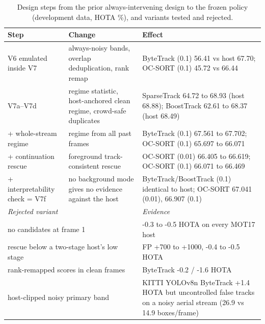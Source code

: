 \begin{table}[t]
\centering
\caption{Design steps from the prior always-intervening design to the frozen policy (development data, HOTA \%), and variants tested and rejected.}
\label{tab:ablation}
\small
\begin{tabular}{p{3.1cm}p{4.8cm}p{6.9cm}}
\hline
Step & Change & Effect \\
\hline
V6 emulated inside V7 & always-noisy bands, overlap deduplication, rank remap & ByteTrack (0.1) 56.41 vs host 67.70; OC-SORT (0.1) 45.72 vs 66.44 \\
V7a--V7d & regime statistic, host-anchored clean regime, crowd-safe duplicates & SparseTrack 64.72 to 68.93 (host 68.88); BoostTrack 62.61 to 68.37 (host 68.49) \\
+ whole-stream regime & regime from all past frames & ByteTrack (0.1) 67.561 to 67.702; OC-SORT (0.1) 65.697 to 66.071 \\
+ continuation rescue & foreground track-consistent rescue & OC-SORT (0.01) 66.405 to 66.619; OC-SORT (0.1) 66.071 to 66.469 \\
+ interpretability check = V7f & no background mode gives no evidence against the host & ByteTrack/BoostTrack (0.1) identical to host; OC-SORT 67.041 (0.01), 66.907 (0.1) \\
\hline
\multicolumn{2}{l}{\textit{Rejected variant}} & \textit{Evidence} \\
\multicolumn{2}{p{8.0cm}}{no candidates at frame 1} & -0.3 to -0.5 HOTA on every MOT17 host \\
\multicolumn{2}{p{8.0cm}}{rescue below a two-stage host's low stage} & FP +700 to +1000, -0.4 to -0.5 HOTA \\
\multicolumn{2}{p{8.0cm}}{rank-remapped scores in clean frames} & ByteTrack -0.2 / -1.6 HOTA \\
\multicolumn{2}{p{8.0cm}}{host-clipped noisy primary band} & KITTI YOLOv8n ByteTrack +1.4 HOTA but uncontrolled false tracks on a noisy aerial stream (26.9 vs 14.9 boxes/frame) \\
\hline
\end{tabular}
\end{table}
